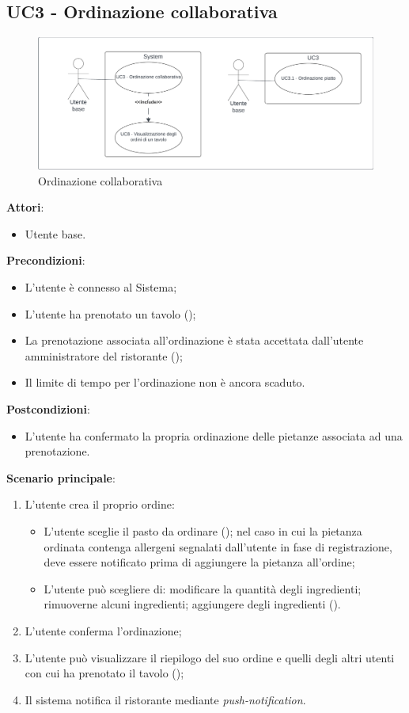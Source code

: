 \subsection{UC3 - Ordinazione collaborativa}\label{usecase:3}

\begin{figure}[H]
    \centering
    \includegraphics[width=0.9\linewidth]{ucd/UCD3_nuovo.png}
    \caption{Ordinazione collaborativa}
\end{figure}

\textbf{Attori}:
\begin{itemize}
    \item Utente base.
\end{itemize}
\textbf{Precondizioni}:
\begin{itemize}
    \item L'utente è connesso al Sistema; 
    \item L'utente ha prenotato un tavolo ();
    \item La prenotazione associata all'ordinazione è stata accettata dall'utente amministratore del ristorante ();
    \item Il limite di tempo per l'ordinazione non è ancora scaduto.
\end{itemize}
\textbf{Postcondizioni}:
\begin{itemize}
    \item L'utente ha confermato la propria ordinazione delle pietanze associata ad una prenotazione.
\end{itemize}
\textbf{Scenario principale}:
\begin{enumerate}
    \item L'utente crea il proprio ordine:
    \begin{itemize}
    \item L'utente sceglie il pasto da ordinare (); nel caso in cui la pietanza ordinata contenga allergeni segnalati dall'utente in fase di registrazione, deve essere notificato prima di  aggiungere la pietanza all'ordine;
    \item L'utente può scegliere di: modificare la quantità degli ingredienti; rimuoverne alcuni ingredienti; aggiungere degli ingredienti ().
    \end{itemize}
    \item L'utente conferma l'ordinazione;
    \item L'utente può visualizzare il riepilogo del suo ordine e quelli degli altri utenti con cui ha prenotato il tavolo ();
    \item Il sistema notifica il ristorante mediante \textit{push-notification}.
\end{enumerate}


